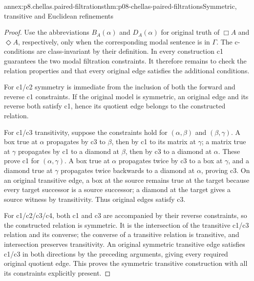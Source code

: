 \begin{annexitem}{annex:p8.chellas.paired-filtrations}{thm:p08-chellas-paired-filtrations}{Symmetric, transitive and Euclidean refinements}
\begin{proof}
Use the abbreviations \(B_A(\alpha)\) and \(D_A(\alpha)\)
for original truth of \(\Box A\) and \(\Diamond A\), respectively,
only when the corresponding modal sentence is in \(\Gamma\).
The c-conditions are class-invariant by their definition.
In every construction c1 guarantees the two modal filtration constraints.
It therefore remains to check the relation properties and that every
original edge satisfies the additional conditions.

For c1/c2 symmetry is immediate from the inclusion of both the
forward and reverse c1 constraints. If the original model is symmetric,
an original edge and its reverse both satisfy c1, hence its quotient
edge belongs to the constructed relation.

For c1/c3 transitivity, suppose the constraints hold for
\((\alpha,\beta)\) and \((\beta,\gamma)\).
A box true at \(\alpha\) propagates by c3 to \(\beta\),
then by c1 to its matrix at \(\gamma\); a matrix true at
\(\gamma\) propagates by c1 to a diamond at \(\beta\),
then by c3 to a diamond at \(\alpha\). These prove c1 for
\((\alpha,\gamma)\). A box true at \(\alpha\) propagates
twice by c3 to a box at \(\gamma\), and a diamond true at
\(\gamma\) propagates twice backwards to a diamond at
\(\alpha\), proving c3. On an original transitive edge, a box
at the source remains true at the target because every target
successor is a source successor; a diamond at the target gives a
source witness by transitivity. Thus original edges satisfy c3.

For c1/c2/c3/c4, both c1 and c3 are accompanied by their reverse
constraints, so the constructed relation is symmetric. It is the
intersection of the transitive c1/c3 relation and its converse;
the converse of a transitive relation is transitive, and intersection
preserves transitivity. An original symmetric transitive edge satisfies
c1/c3 in both directions by the preceding arguments, giving every
required original quotient edge. This proves the symmetric transitive
construction with all its constraints explicitly present.


\end{proof}
\end{annexitem}
